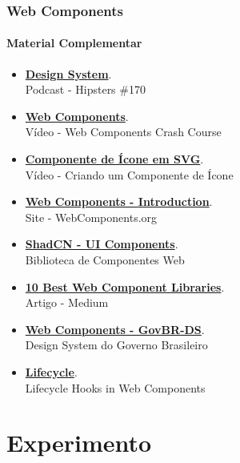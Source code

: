 \documentclass[
	9pt, %
	t, %
]{beamer}
\newcommand{\iconLink}[2]{\href{#1}{\faLink \hspace{0.2em} {#2}}}
\begin{document}
\begin{frame}
	\frametitle{Web Components}
	\framesubtitle{Material Complementar}

	\begin{itemize}
		\item \iconLink{https://www.hipsters.tech/design-systems-hipsters-170/}{\textbf{Design System}}.\\Podcast - Hipsters \#170
		\item \iconLink{https://www.youtube.com/watch?v=PCWaFLy3VUo}{\textbf{Web Components}}.\\Vídeo - Web Components Crash Course
		\item \iconLink{https://youtu.be/7tsyjXxaloI?list=PL6BL1eKvLWOvfRhcDB0a5XJ2PD1_Rol6K}{\textbf{Componente de Ícone em SVG}}.\\Vídeo - Criando um Componente de Ícone
		\item \iconLink{https://www.webcomponents.org/introduction}{\textbf{Web Components - Introduction}}.\\Site - WebComponents.org
		\item \iconLink{https://ui.shadcn.com/}{\textbf{ShadCN - UI Components}}.\\Biblioteca de Componentes Web
		\item \iconLink{https://medium.com/@yourkube/10-best-web-component-libraries-b470541277e8}{\textbf{10 Best Web Component Libraries}}.\\Artigo - Medium
		\item \iconLink{https://webcomponent-ds.estaleiro.serpro.gov.br}{\textbf{Web Components - GovBR-DS}}.\\Design System do Governo Brasileiro
		\item \iconLink{https://ultimatecourses.com/blog/lifecycle-hooks-in-web-components}{\textbf{Lifecycle}}.\\Lifecycle Hooks in Web Components
	\end{itemize}

\end{frame}

\section{Experimento}
\end{document}
